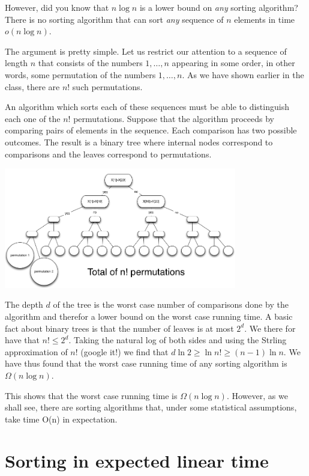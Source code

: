 \documentclass{report}
\theoremstyle{plain}
\theoremstyle{definition}
\begin{document}
However, did you know that $n \log n$ is a lower bound on {\em any} sorting
algorithm? There is no sorting algorithm that can sort {\em any}
sequence of $n$ elements in time $o(n\log n)$. 

The argument is pretty simple. Let us restrict our attention to a
sequence of length $n$ that consists of the numbers $1,\ldots,n$
appearing in some order,  in other words, some permutation of the
numbers $1,\ldots,n$. As we have shown earlier in the class, there are
$n!$ such permutations.

An algorithm which sorts each of these sequences must be able to
distinguish each one of the $n!$ permutations. Suppose that the
algorithm proceeds by comparing pairs of elements in the
sequence. Each comparison has two possible outcomes. The result is a
binary tree where internal nodes correspond to comparisons and the
leaves correspond to permutations.

\begin{center}
\includegraphics[width=4in]{figs/SortingLowerBound.png}
\end{center}

The depth $d$ of the tree is the worst case number of comparisons done by
the algorithm and therefor a lower bound on the worst case running
time. A basic fact about binary trees is that the number of leaves is
at most $2^d$. We there for have that $n! \leq 2^d$. Taking the
natural log of both sides and using the Strling approximation of 
$n!$ (google it!) we
find that $d \ln 2 \geq \ln n! \geq (n-1) \ln n$. We have thus found that the
worst case running time of any sorting algorithm is $\Omega(n \log n)$.

This shows that the worst case running time is $\Omega(n \log
n)$. However, as we shall see, there are sorting algorithms that,
under some statistical assumptions, take time O(n) in expectation.

\section{Sorting in expected linear time}
\end{document}
